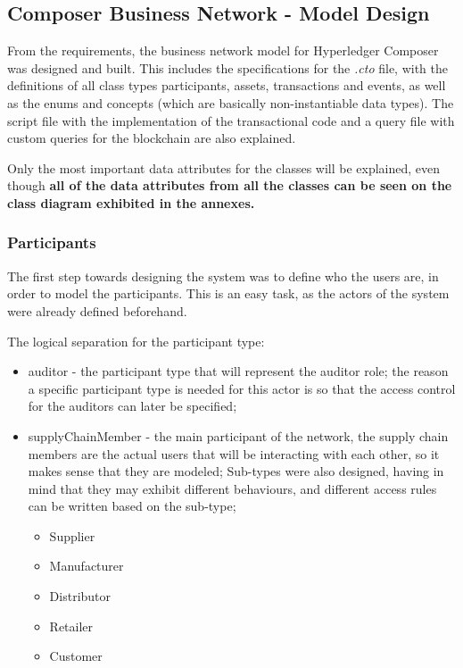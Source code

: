 


\subsection{Composer Business Network - Model Design}

From the requirements, the business network model for Hyperledger Composer was designed and built. This includes the specifications for the \textit{.cto} file, with the definitions of all class types participants, assets, transactions and events, as well as the enums and concepts (which are basically non-instantiable data types). The script file with the implementation of the transactional code and a query file with custom queries for the blockchain are also explained.

Only the most important data attributes for the classes will be explained, even though \textbf{all of the data attributes from all the classes can be seen on the class diagram exhibited in the annexes.}

\subsubsection*{Participants}

The first step towards designing the system was to define who the users are, in order to model the participants. This is an easy task, as the actors of the system were already defined beforehand.

The logical separation for the participant type:
\begin{itemize}
    \item auditor - the participant type that will represent the auditor role; the reason a specific participant type is needed for this actor is so that the access control for the auditors can later be specified;
    \item supplyChainMember - the main participant of the network, the supply chain members are the actual users that will be interacting with each other, so it makes sense that they are modeled; Sub-types were also designed, having in mind that they may exhibit different behaviours, and different access rules can be written based on the sub-type;
    \begin{itemize}
        \item Supplier 
        \item Manufacturer 
        \item Distributor 
        \item Retailer 
        \item Customer
    \end{itemize}
\end{itemize}

